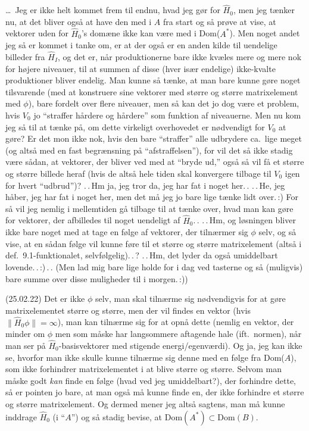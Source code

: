 \documentclass{report}
\begin{document}
\ldots\ Jeg er ikke helt kommet frem til endnu, hvad jeg gør for $\hat H_0$, men jeg tænker nu, at det bliver også at have den med i $A$ fra start og så prøve at vise, at vektorer uden for $\hat H_0$'s domæne ikke kan være med i Dom($A^*$). Men noget andet jeg så er kommet i tanke om, er at der også er en anden kilde til uendelige billeder fra $\hat H_I$, og det er, når produktionerne bare ikke kvæles mere og mere nok for højere niveauer, til at summen af disse (hver især endelige) ikke-kvalte produktioner bliver endelig. Man kunne så tænke, at man bare kunne gøre noget tilsvarende (med at konstruere sine vektorer med større og større matrixelement med $\phi$), bare fordelt over flere niveauer, men så kan det jo dog være et problem, hvis $V_0$ jo ``straffer hårdere og hårdere'' som funktion af niveauerne. Men nu kom jeg så til at tænke på, om dette virkeligt overhovedet er nødvendigt for $V_0$ at gøre? Er det mon ikke nok, hvis den bare ``straffer'' alle udbrydere ca.\ lige meget (og altså med en fast begrænsning på ``afstraffelsen''), for vil det så ikke stadig være sådan, at vektorer, der bliver ved med at ``bryde ud,'' også så vil få et større og større billede heraf (hvis de altså hele tiden skal konvergere tilbage til $V_0$ igen for hvert ``udbrud'')? .\,.\,Hm ja, jeg tror da, jeg har fat i noget her.\,. .\,.\,He, jeg håber, jeg har fat i noget her, men det må jeg jo bare lige tænke lidt over.\,:) For så vil jeg nemlig i mellemtiden gå tilbage til at tænke over, hvad man kan gøre for vektorer, der afbilledes til noget uendeligt af $\hat H_0$.\,. .\,.\,Hm, og løsningen bliver ikke bare noget med at tage en følge af vektorer, der tilnærmer sig $\phi$ selv, og så vise, at en sådan følge vil kunne føre til et større og større matrixelement (altså i def.\ 9.1-funktionalet, selvfølgelig).\,.\,? .\,.\,Hm, det lyder da også umiddelbart lovende.\,.\,:)\,.\,. (Men lad mig bare lige holde for i dag ved tasterne og så (muligvis) bare summe over disse muligheder til i morgen.\,:))


(25.02.22) Det er ikke $\phi$ selv, man skal tilnærme sig nødvendigvis for at gøre matrixelementet større og større, men der vil findes en vektor (hvis $\|\hat H_0 \phi \| = \infty$), man kan tilnærme sig for at opnå dette (nemlig en vektor, der minder om $\phi$ men som måske har langsommere aftagende hale (ift.\ normen), når man ser på $\hat H_0$-basisvektorer med stigende energi/egenværdi). Og ja, jeg kan ikke se, hvorfor man ikke skulle kunne tilnærme sig denne med en følge fra Dom($A$), som ikke forhindrer matrixelementet i at blive større og større. Selvom man måske godt \emph{kan} finde en følge (hvad ved jeg umiddelbart?), der forhindre dette, så er pointen jo bare, at man også må kunne finde en, der ikke forhindre et større og større matrixelement. Og dermed mener jeg altså sagtens, man må kunne inddrage $\hat H_0$ (i ``$A$'') og så stadig bevise, at $\mathrm{Dom}(A^*) \subset \mathrm{Dom}(B)$.
\end{document}
